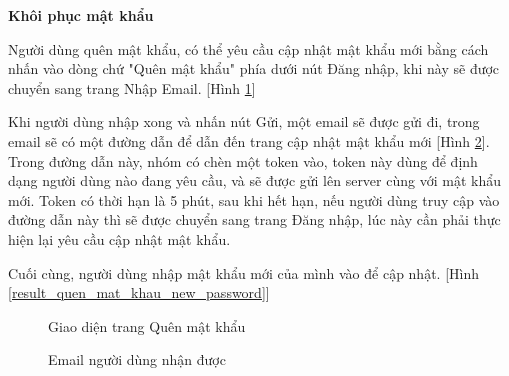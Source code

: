 \textbf{Khôi phục mật khẩu}

Người dùng quên mật khẩu, có thể yêu cầu cập nhật mật khẩu mới bằng cách nhấn vào dòng chứ "Quên mật khẩu" phía dưới nút Đăng nhập, khi này sẽ được chuyển sang trang Nhập Email. [Hình \ref{result_quen_mat_khau_email}]\par
Khi người dùng nhập xong và nhấn nút Gửi, một email sẽ được gửi đi, trong email sẽ có một đường dẫn để dẫn đến trang cập nhật mật khẩu mới [Hình \ref{result_quen_mat_khau_email_receive}]. Trong đường dẫn này, nhóm có chèn một token vào, token này dùng để định dạng người dùng nào đang yêu cầu, và sẽ được gửi lên server cùng với mật khẩu mới. Token có thời hạn là 5 phút, sau khi hết hạn, nếu người dùng truy cập vào đường dẫn này thì sẽ được chuyển sang trang Đăng nhập, lúc này cần phải thực hiện lại yêu cầu cập nhật mật khẩu.\par
Cuối cùng, người dùng nhập mật khẩu mới của mình vào để cập nhật. [Hình \ref{result_quen_mat_khau_new_password}]

\begin{figure}[H]
    \begin{center}
        \caption{Giao diện trang Quên mật khẩu}
        \label{result_quen_mat_khau_email}
    \end{center}
\end{figure}

\begin{figure}[H]
    \begin{center}
        \caption{Email người dùng nhận được}
        \label{result_quen_mat_khau_email_receive}
    \end{center}
\end{figure}

